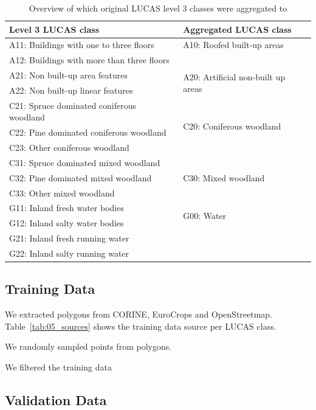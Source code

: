 \begin{table}[]
\begin{tabular}{@{}ll@{}}

Level 3 LUCAS class & Aggregated LUCAS class \\ 
\midrule
A11: Buildings with one to three floors & A10: Roofed built-up areas \\
A12: Buildings with more than three floors &  \\
A21: Non built-up area features & \multirow{2}{*}{A20: Artificial non-built up areas} \\
A22: Non built-up linear features &  \\
C21: Spruce dominated coniferous woodland & \multirow{3}{*}{C20: Coniferous woodland} \\
C22: Pine dominated coniferous woodland &  \\
C23: Other coniferous woodland &  \\
C31: Spruce dominated mixed woodland & \multirow{3}{*}{C30: Mixed woodland} \\
C32: Pine dominated mixed woodland &  \\
C33: Other mixed woodland &  \\
G11: Inland fresh water bodies & \multirow{2}{*}{G00: Water} \\
G12: Inland salty water bodies &  \\
G21: Inland fresh running water &  \\
G22: Inland salty running water &  \\
\midrule
\end{tabular}
\caption{Overview of which original LUCAS level 3 classes were aggregated to }
\label{tab:05_legend_aggregation}
\end{table}

\subsection{Training Data}
We extracted polygons from CORINE, EuroCrops and OpenStreetmap. Table~\ref{tab:05_sources} shows the training data source per LUCAS class.

We randomly sampled points from polygons.

We filtered the training data



\subsection{Validation Data}

